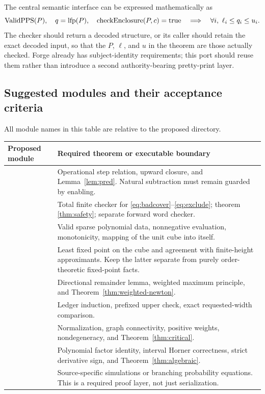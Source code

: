 The central semantic interface can be expressed mathematically as
\[
 \operatorname{ValidPPS}(P),\quad
 q=\operatorname{lfp}(P),\quad
 \operatorname{checkEnclosure}(P,c)=\mathrm{true}
 \quad\Longrightarrow\quad
 \forall i,\ \ell_i\le q_i\le u_i.
\]
The checker should return a decoded structure, or its caller should retain the exact decoded input, so that the $P$, $\ell$, and $u$ in the theorem are those actually checked. Forge already has subject-identity requirements; this port should reuse them rather than introduce a second authority-bearing pretty-print layer.

\subsection{Suggested modules and their acceptance criteria}
All module names in this table are relative to the proposed  directory.
\begin{longtable}{P{0.25\textwidth}P{0.64\textwidth}}
\toprule
Proposed module & Required theorem or executable boundary \\
\midrule
{} & Operational step relation, upward closure, and Lemma~\ref{lem:pred}. Natural subtraction must remain guarded by enabling.\\[4pt]
 & Total finite checker for \eqref{eq:badcover}--\eqref{eq:exclude}; theorem \ref{thm:safety}; separate forward word checker.\\[4pt]
 & Valid sparse polynomial data, nonnegative evaluation, monotonicity, mapping of the unit cube into itself.\\[4pt]
 & Least fixed point on the cube and agreement with finite-height approximants. Keep the latter separate from purely order-theoretic fixed-point facts.\\[4pt]
 & Directional remainder lemma, weighted maximum principle, and Theorem~\ref{thm:weighted-newton}.\\[4pt]
 & Ledger induction, prefixed upper check, exact requested-width comparison.\\[4pt]
 & Normalization, graph connectivity, positive weights, nondegeneracy, and Theorem~\ref{thm:critical}.\\[4pt]
 & Polynomial factor identity, interval Horner correctness, strict derivative sign, and Theorem~\ref{thm:algebraic}.\\[4pt]
 & Source-specific simulations or branching probability equations. This is a required proof layer, not just serialization.\\
\bottomrule
\end{longtable}

